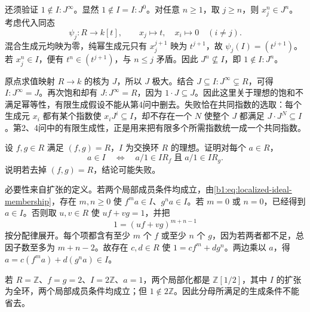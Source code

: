 \begin{solution}
	还须验证 \(1\notin I:J^\infty\)。显然 \(1\notin I=I:J^0\)。对任意 \(n\ge1\)，取 \(j\ge n\)，则 \(x_j^n\in J^n\)。考虑代入同态
	\[
		\psi_j:R\longrightarrow k[t],\qquad x_j\longmapsto t,\quad x_i\longmapsto0\quad(i\ne j).
	\]
	混合生成元均映为零，纯幂生成元只有 \(x_j^{j+1}\) 映为 \(t^{j+1}\)，故 \(\psi_j(I)=(t^{j+1})\)。若 \(x_j^n\in I\)，便有 \(t^n\in(t^{j+1})\)，与 \(n\le j\) 矛盾。因此 \(J^n\nsubseteq I\)，即 \(1\notin I:J^n\)。

	原点求值映射 \(R\to k\) 的核为 \(J\)，所以 \(J\) 极大。结合 \(J\subseteq I:J^\infty\subsetneq R\)，可得 \(I:J^\infty=J\)。再次饱和却有 \(J:J^\infty=R\)，因为 \(1\cdot J\subseteq J\)。因此这里关于理想的饱和不满足幂等性，有限生成假设不能从第4问中删去。失败恰在共同指数的选取：每个生成元 \(x_i\) 都有某个指数使 \(x_iJ^i\subseteq I\)，却不存在一个 \(N\) 使整个 \(J\) 都满足 \(J\cdot J^N\subseteq I\)。第2、4问中的有限生成性，正是用来把有限多个所需指数统一成一个共同指数。
\end{solution}

\begin{exercise}\label{b1:ex:13-8}
	设 \(f,g\in R\) 满足 \((f,g)=R\)，\(I\) 为交换环 \(R\) 的理想。证明对每个 \(a\in R\)，
	\[
		a\in I\quad\Longleftrightarrow\quad a/1\in IR_f\;\text{且}\;a/1\in IR_g.
	\]
	说明若去掉 \((f,g)=R\)，结论可能失败。
\end{exercise}
\begin{solution}
	必要性来自扩张的定义。若两个局部成员条件均成立，由\eqref{b1:eq:localized-ideal-membership}，存在 \(m,n\geq0\) 使 \(f^ma\in I\)、\(g^na\in I\)。若 \(m=0\) 或 \(n=0\)，已经得到 \(a\in I\)。否则取 \(u,v\in R\) 使 \(uf+vg=1\)，并把
	\[
		1=(uf+vg)^{m+n-1}
	\]
	按分配律展开。每个项都含有至少 \(m\) 个 \(f\) 或至少 \(n\) 个 \(g\)，因为若两者都不足，总因子数至多为 \(m+n-2\)。故存在 \(c,d\in R\) 使 \(1=cf^m+dg^n\)。两边乘以 \(a\)，得 \(a=c(f^ma)+d(g^na)\in I\)。

	若 \(R=\mathbb Z\)、\(f=g=2\)、\(I=2\mathbb Z\)、\(a=1\)，两个局部化都是 \(\mathbb Z[1/2]\)，其中 \(I\) 的扩张为全环，两个局部成员条件均成立；但 \(1\notin2\mathbb Z\)。因此分母所满足的生成条件不能省去。
\end{solution}
